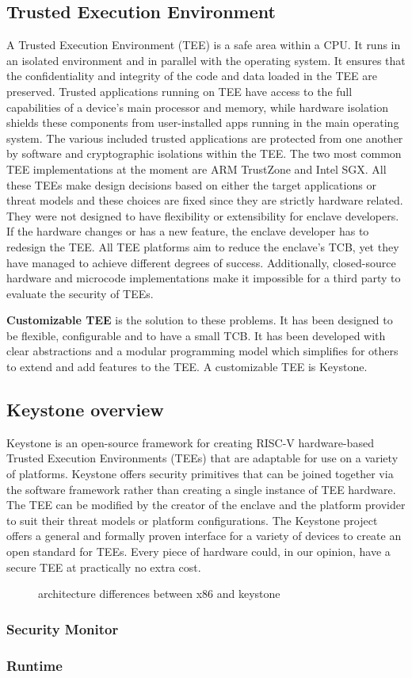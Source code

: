 \subsection{Trusted Execution Environment}
A Trusted Execution Environment (TEE) is a safe area within a CPU. It runs in an isolated environment and in parallel with the operating system.
It ensures that the confidentiality and integrity of the code and data loaded in the TEE are preserved. 
Trusted applications running on TEE have access to the full capabilities of a device's main processor and memory, while hardware isolation shields these components from user-installed apps running in the main operating system. The various included trusted applications are protected from one another by software and cryptographic isolations within the TEE.
\cite{IntroTEE}
The two most common TEE implementations at the moment are ARM TrustZone and Intel SGX. All these TEEs make design decisions based on either the target applications or threat models and these choices are fixed since they are strictly hardware related. They were not designed to have flexibility or extensibility for enclave developers.  If the hardware changes or has a new feature, the enclave developer has to redesign the TEE.
All TEE platforms aim to reduce the enclave's TCB, yet they have managed to achieve different degrees of success. Additionally, closed-source hardware and microcode implementations make it impossible for a third party to evaluate the security of TEEs.



\textbf{Customizable TEE} is the solution to these problems. It has been designed to be flexible, configurable and to have a small TCB. It has been developed with clear abstractions and a modular programming model which simplifies for others to extend and add features to the TEE. A customizable TEE is Keystone.
\cite{lee2020keystone} 
\subsection{Keystone overview}
Keystone \cite{lee2020keystone} is an open-source framework for creating RISC-V hardware-based Trusted Execution Environments (TEEs) that are adaptable for use on a variety of platforms. Keystone offers security primitives that can be joined together via the software framework rather than creating a single instance of TEE hardware. The TEE can be modified by the creator of the enclave and the platform provider to suit their threat models or platform configurations. The Keystone project offers a general and formally proven interface for a variety of devices to create an open standard for TEEs. Every piece of hardware could, in our opinion, have a secure TEE at practically no extra cost.

\begin{figure}[h!]
    \centering
    
    \caption{architecture differences between x86 and keystone}
    \label{keystone-vs-x86}
\end{figure}
\subsubsection{Security Monitor}
\subsubsection{Runtime}